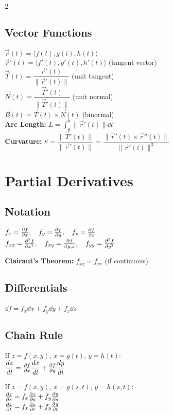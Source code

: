 \documentclass[8pt]{extarticle}
\begin{document}
\begin{multicols}{2}
\subsection*{Vector Functions}
$\vec{r}(t) = \langle f(t), g(t), h(t) \rangle$ \\
$\vec{r}'(t) = \langle f'(t), g'(t), h'(t) \rangle$ (tangent vector) \\
$\vec{T}(t) = \dfrac{\vec{r}'(t)}{\|\vec{r}'(t)\|}$ (unit tangent) \\
$\vec{N}(t) = \dfrac{\vec{T}'(t)}{\|\vec{T}'(t)\|}$ (unit normal) \\
$\vec{B}(t) = \vec{T}(t) \times \vec{N}(t)$ (binormal) \\
\textbf{Arc Length:} $L = \int_a^b \|\vec{r}'(t)\| \dd{t}$ \\
\textbf{Curvature:} $\kappa = \dfrac{\|\vec{T}'(t)\|}{\|\vec{r}'(t)\|} = \dfrac{\|\vec{r}'(t) \times \vec{r}''(t)\|}{\|\vec{r}'(t)\|^3}$

\section*{Partial Derivatives}

\subsection*{Notation}
$f_x = \pdv{f}{x}, \quad f_y = \pdv{f}{y}, \quad f_z = \pdv{f}{z}$ \\
$f_{xx} = \pdv[2]{f}{x}, \quad f_{xy} = \pdv{f}{y,x}, \quad f_{yy} = \pdv[2]{f}{y}$

\textbf{Clairaut's Theorem:} $f_{xy} = f_{yx}$ (if continuous)

\subsection*{Differentials}
$\dd{f} = f_x \dd{x} + f_y \dd{y} + f_z \dd{z}$

\subsection*{Chain Rule}
If $z = f(x,y)$, $x = g(t)$, $y = h(t)$: \\
$\dfrac{dz}{dt} = \pdv{f}{x}\dfrac{dx}{dt} + \pdv{f}{y}\dfrac{dy}{dt}$

If $z = f(x,y)$, $x = g(s,t)$, $y = h(s,t)$: \\
$\pdv{z}{s} = f_x\pdv{x}{s} + f_y\pdv{y}{s}$ \\
$\pdv{z}{t} = f_x\pdv{x}{t} + f_y\pdv{y}{t}$


\end{multicols}
\end{document}
